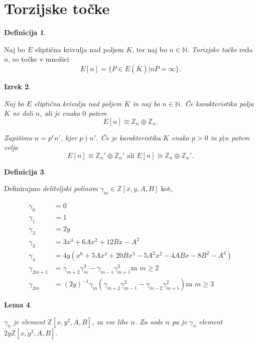 \documentclass[12pt,a4paper,twoside]{article}
\theoremstyle{definition} %
\newtheorem{definicija}{Definicija}[section]
\theoremstyle{plain} %
\newtheorem{lema}[definicija]{Lema}
\newtheorem{izrek}[definicija]{Izrek}
\numberwithin{equation}{section}  %
\newcommand{\N}{\mathbb N}
\newcommand{\Z}{\mathbb Z}
\newcommand{\E}[1]{E({#1})}
\begin{document}
\section{Torzijske točke}

\begin{definicija}~

Naj bo $E$ eliptična krivulja nad poljem $K$, ter naj bo $n\in \N$. \emph{Torizjske točke} reda $n$, so točke v množici
$$E[n] = \{ P \in \E{\overline{K}} | nP = \infty \}.$$
\end{definicija}

\begin{izrek}~

\label{IzrekTor}
Naj bo $E$ eliptična krivulja nad poljem $K$ in naj bo $n \in \N$. Če karakteristika polja $K$ ne deli $n$, ali je enaka $0$ potem
$$E[n] \cong \mathbb{Z}_n \oplus \mathbb{Z}_n.$$

Zapišimo $n=p^rn'$, kjer $p\nmid n'$. Če je karakteristika $K$ enaka $p >0$ in $p|n$ potem velja
$$E[n] \cong \mathbb{Z}_n' \oplus \mathbb{Z}_n' \text{ ali } E[n] \cong \mathbb{Z}_n \oplus \mathbb{Z}_n'.$$

\end{izrek}

\begin{definicija}~

Definirajmo \emph{deliteljski polinom} $\gamma_m \in \Z[x,y,A,B]$ kot,


\begin{align}
\gamma_0 &{}= 0  \nonumber \\
\gamma_1 &{}= 1  \nonumber \\
\gamma_2 &{}= 2y  \nonumber \\
\gamma_3 &{}= 3x^4 + 6Ax^2 + 12Bx-A^2 \nonumber \\
\gamma_4 &{}= 4y(x^6+5Ax^4+20Bx^3-5A^2x^2-4ABx-8B^2-A^3) \nonumber \\
\gamma_{2m+1} &{}= \gamma_{m+2}\gamma_{m}^3-\gamma_{m-1}\gamma_{m+1}^3 \text{za } m \geq 2 \nonumber \\
\gamma_{2m} &{}= (2y)^{-1}\gamma_{m}(\gamma_{m+2}\gamma_{m-1}^2-\gamma_{m-2}\gamma_{m+1}^2)\text{za } m \geq 3 \nonumber
\end{align}

\end{definicija}

\begin{lema}~

$\gamma_{n}$ je element $\Z[x,y^2,A,B]$, za vse lihe $n$.  Za sode $n$ pa je $\gamma_{n}$ element \newline $2y\Z[x,y^2,A,B]$.

\end{lema}
\end{document}
